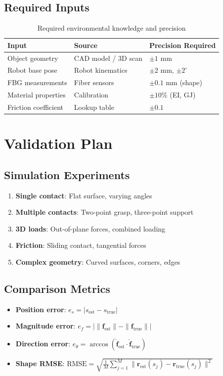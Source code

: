\documentclass[11pt]{article}
\begin{document}
\subsection{Required Inputs}

\begin{table}[h]
\centering
\begin{tabular}{@{}lll@{}}
\toprule
\textbf{Input} & \textbf{Source} & \textbf{Precision Required} \\ \midrule
Object geometry & CAD model / 3D scan & $\pm 1$ mm \\
Robot base pose & Robot kinematics & $\pm 2$ mm, $\pm 2^\circ$ \\
FBG measurements & Fiber sensors & $\pm 0.1$ mm (shape) \\
Material properties & Calibration & $\pm 10\%$ (EI, GJ) \\
Friction coefficient & Lookup table & $\pm 0.1$ \\ \bottomrule
\end{tabular}
\caption{Required environmental knowledge and precision}
\end{table}

\section{Validation Plan}

\subsection{Simulation Experiments}

\begin{enumerate}
    \item \textbf{Single contact}: Flat surface, varying angles
    \item \textbf{Multiple contacts}: Two-point grasp, three-point support
    \item \textbf{3D loads}: Out-of-plane forces, combined loading
    \item \textbf{Friction}: Sliding contact, tangential forces
    \item \textbf{Complex geometry}: Curved surfaces, corners, edges
\end{enumerate}

\subsection{Comparison Metrics}

\begin{itemize}
    \item \textbf{Position error}: $e_s = |s_{\text{est}} - s_{\text{true}}|$
    \item \textbf{Magnitude error}: $e_f = |\|\mathbf{f}_{\text{est}}\| - \|\mathbf{f}_{\text{true}}\||$
    \item \textbf{Direction error}: $e_\theta = \arccos(\hat{\mathbf{f}}_{\text{est}} \cdot \hat{\mathbf{f}}_{\text{true}})$
    \item \textbf{Shape RMSE}: $\text{RMSE} = \sqrt{\frac{1}{M}\sum_{j=1}^{M} \|\mathbf{r}_{\text{est}}(s_j) - \mathbf{r}_{\text{true}}(s_j)\|^2}$
\end{itemize}
\end{document}

